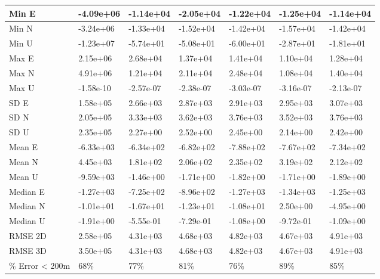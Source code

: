 \begin{longtable}{|l|l|l|l|l|l|l|}
        \hline
        \endlastfoot
Min E          &  -4.09e+06 &  -1.14e+04 &  -2.05e+04 &  -1.22e+04 &  -1.25e+04 &   -1.14e+04 \\ \hline
Min N          &  -3.24e+06 &  -1.33e+04 &  -1.52e+04 &  -1.42e+04 &  -1.57e+04 &   -1.42e+04 \\ \hline
Min U          &  -1.23e+07 &  -5.74e+01 &  -5.08e+01 &  -6.00e+01 &  -2.87e+01 &   -1.81e+01 \\ \hline
Max E          &   2.15e+06 &   2.68e+04 &   1.37e+04 &   1.41e+04 &   1.10e+04 &    1.28e+04 \\ \hline
Max N          &   4.91e+06 &   1.21e+04 &   2.11e+04 &   2.48e+04 &   1.08e+04 &    1.40e+04 \\ \hline
Max U          &  -1.58e-10 &  -2.57e-07 &  -2.38e-07 &  -3.03e-07 &  -3.16e-07 &   -2.13e-07 \\ \hline
SD E           &   1.58e+05 &   2.66e+03 &   2.87e+03 &   2.91e+03 &   2.95e+03 &    3.07e+03 \\ \hline
SD N           &   2.05e+05 &   3.33e+03 &   3.62e+03 &   3.76e+03 &   3.52e+03 &    3.76e+03 \\ \hline
SD U           &   2.35e+05 &   2.27e+00 &   2.52e+00 &   2.45e+00 &   2.14e+00 &    2.42e+00 \\ \hline
Mean E         &  -6.33e+03 &  -6.34e+02 &  -6.82e+02 &  -7.88e+02 &  -7.67e+02 &   -7.34e+02 \\ \hline
Mean N         &   4.45e+03 &   1.81e+02 &   2.06e+02 &   2.35e+02 &   3.19e+02 &    2.12e+02 \\ \hline
Mean U         &  -9.59e+03 &  -1.46e+00 &  -1.71e+00 &  -1.82e+00 &  -1.71e+00 &   -1.89e+00 \\ \hline
Median E       &  -1.27e+03 &  -7.25e+02 &  -8.96e+02 &  -1.27e+03 &  -1.34e+03 &   -1.25e+03 \\ \hline
Median N       &  -1.01e+01 &  -1.67e+01 &  -1.23e+01 &  -1.08e+01 &   2.50e+00 &   -4.95e+00 \\ \hline
Median U       &  -1.91e+00 &  -5.55e-01 &  -7.29e-01 &  -1.08e+00 &  -9.72e-01 &   -1.09e+00 \\ \hline
RMSE 2D        &   2.58e+05 &   4.31e+03 &   4.68e+03 &   4.82e+03 &   4.67e+03 &    4.91e+03 \\ \hline
RMSE 3D        &   3.50e+05 &   4.31e+03 &   4.68e+03 &   4.82e+03 &   4.67e+03 &    4.91e+03 \\ \hline
\% Error < 200m &        68\% &        77\% &        81\% &        76\% &        89\% &         85\% \\ \hline
\end{longtable}
